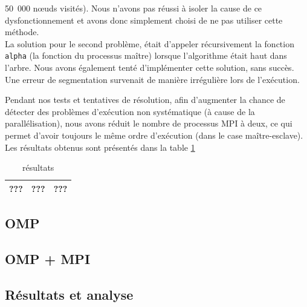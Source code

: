 \documentclass[12pt]{article}
\begin{document}
    50~000 n\oe uds visités). Nous n'avons pas réussi à isoler la cause de ce
    dysfonctionnement et avons donc simplement choisi de ne pas utiliser cette
    méthode.\\
    La solution pour le second problème, était d'appeler récursivement
    la fonction \texttt{alpha} (la fonction du processus maître)
    lorsque l'algorithme était haut dans l'arbre. Nous avons également
    tenté d'implémenter cette solution, sans succès. Une erreur
    de segmentation survenait de manière irrégulière lors de l'exécution.\\
    \par Pendant nos tests et tentatives de résolution, afin d'augmenter
    la chance de détecter des problèmes d'exécution non systématique (à
    cause de la parallélisation), nous avons réduit le nombre de processus MPI
    à deux, ce qui permet d'avoir toujours le même ordre d'exécution (dans le
    case maître-esclave).
    Les résultats obtenus sont présentés dans la table \ref{tab:alpha}
    \begin{table} \begin{center}
    	\begin{tabular}{|c|c|c|}
    	\hline
    	??? & ??? & ??? \\ \hline
    	\end{tabular}
    	\caption{\label{tab:alpha}\color{red} résultats}
    \end{center} \end{table}
    \subsection{OMP}
    \subsection{OMP + MPI}
    \subsection{Résultats et analyse}
\end{document}
